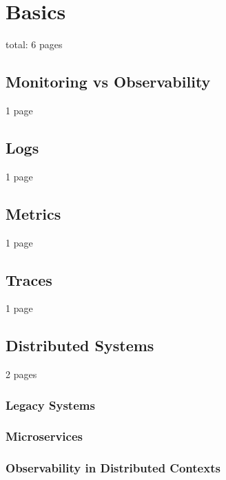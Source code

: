 \chapter{Basics}
\label{chap:basics}

total: 6 pages

\section{Monitoring vs Observability}
\label{sec:b_monitoring_vs_observability}

1 page

\section{Logs}
\label{sec_b_logs}

1 page

\section{Metrics}
\label{sec_b_metrics}

1 page

\section{Traces}
\label{sec_b_traces}

1 page

\section{Distributed Systems}
\label{sec_b_distributed_systems}

2 pages

\subsection{Legacy Systems}
\subsection{Microservices}
\subsection{Observability in Distributed Contexts}